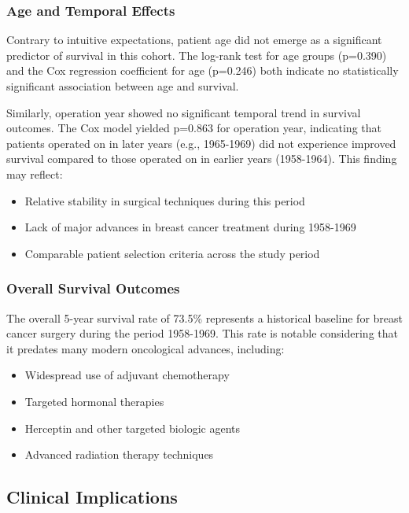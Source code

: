 \documentclass[12pt,a4paper]{article}
\begin{document}
\subsubsection{Age and Temporal Effects}

Contrary to intuitive expectations, patient age did not emerge as a significant predictor of survival in this cohort. The log-rank test for age groups (p=0.390) and the Cox regression coefficient for age (p=0.246) both indicate no statistically significant association between age and survival.

Similarly, operation year showed no significant temporal trend in survival outcomes. The Cox model yielded p=0.863 for operation year, indicating that patients operated on in later years (e.g., 1965-1969) did not experience improved survival compared to those operated on in earlier years (1958-1964). This finding may reflect:
\begin{itemize}
    \item Relative stability in surgical techniques during this period
    \item Lack of major advances in breast cancer treatment during 1958-1969
    \item Comparable patient selection criteria across the study period
\end{itemize}

\subsubsection{Overall Survival Outcomes}

The overall 5-year survival rate of 73.5\% represents a historical baseline for breast cancer surgery during the period 1958-1969. This rate is notable considering that it predates many modern oncological advances, including:
\begin{itemize}
    \item Widespread use of adjuvant chemotherapy
    \item Targeted hormonal therapies
    \item Herceptin and other targeted biologic agents
    \item Advanced radiation therapy techniques
\end{itemize}

\subsection{Clinical Implications}
\end{document}
